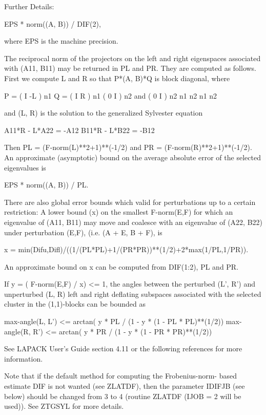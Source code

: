 \begin{DoxyParagraph}{Further Details\+: }
\begin{DoxyVerb}
       EPS * norm((A, B)) / DIF(2),

  where EPS is the machine precision.

  The reciprocal norm of the projectors on the left and right
  eigenspaces associated with (A11, B11) may be returned in PL and PR.
  They are computed as follows. First we compute L and R so that
  P*(A, B)*Q is block diagonal, where

       P = ( I -L ) n1           Q = ( I R ) n1
           ( 0  I ) n2    and        ( 0 I ) n2
             n1 n2                    n1 n2

  and (L, R) is the solution to the generalized Sylvester equation

       A11*R - L*A22 = -A12
       B11*R - L*B22 = -B12

  Then PL = (F-norm(L)**2+1)**(-1/2) and PR = (F-norm(R)**2+1)**(-1/2).
  An approximate (asymptotic) bound on the average absolute error of
  the selected eigenvalues is

       EPS * norm((A, B)) / PL.

  There are also global error bounds which valid for perturbations up
  to a certain restriction:  A lower bound (x) on the smallest
  F-norm(E,F) for which an eigenvalue of (A11, B11) may move and
  coalesce with an eigenvalue of (A22, B22) under perturbation (E,F),
  (i.e. (A + E, B + F), is

   x = min(Difu,Difl)/((1/(PL*PL)+1/(PR*PR))**(1/2)+2*max(1/PL,1/PR)).

  An approximate bound on x can be computed from DIF(1:2), PL and PR.

  If y = ( F-norm(E,F) / x) <= 1, the angles between the perturbed
  (L', R') and unperturbed (L, R) left and right deflating subspaces
  associated with the selected cluster in the (1,1)-blocks can be
  bounded as

   max-angle(L, L') <= arctan( y * PL / (1 - y * (1 - PL * PL)**(1/2))
   max-angle(R, R') <= arctan( y * PR / (1 - y * (1 - PR * PR)**(1/2))

  See LAPACK User's Guide section 4.11 or the following references
  for more information.

  Note that if the default method for computing the Frobenius-norm-
  based estimate DIF is not wanted (see ZLATDF), then the parameter
  IDIFJB (see below) should be changed from 3 to 4 (routine ZLATDF
  (IJOB = 2 will be used)). See ZTGSYL for more details.\end{DoxyVerb}
 
\end{DoxyParagraph}
